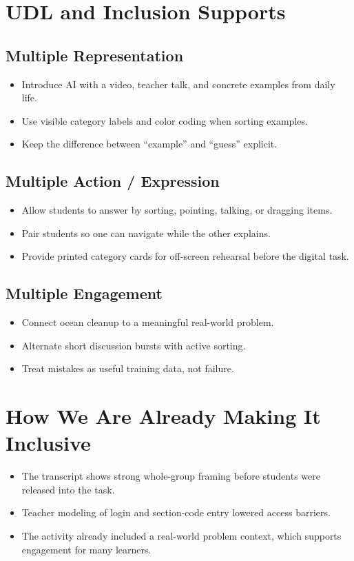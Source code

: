 \documentclass[11pt]{article}
\begin{document}
\section*{UDL and Inclusion Supports}
\subsection*{Multiple Representation}
\begin{itemize}[leftmargin=*]
\item Introduce AI with a video, teacher talk, and concrete examples from daily life.
\item Use visible category labels and color coding when sorting examples.
\item Keep the difference between “example” and “guess” explicit.
\end{itemize}

\subsection*{Multiple Action / Expression}
\begin{itemize}[leftmargin=*]
\item Allow students to answer by sorting, pointing, talking, or dragging items.
\item Pair students so one can navigate while the other explains.
\item Provide printed category cards for off-screen rehearsal before the digital task.
\end{itemize}

\subsection*{Multiple Engagement}
\begin{itemize}[leftmargin=*]
\item Connect ocean cleanup to a meaningful real-world problem.
\item Alternate short discussion bursts with active sorting.
\item Treat mistakes as useful training data, not failure.
\end{itemize}

\section*{How We Are Already Making It Inclusive}
\begin{itemize}[leftmargin=*]
\item The transcript shows strong whole-group framing before students were released into the task.
\item Teacher modeling of login and section-code entry lowered access barriers.
\item The activity already included a real-world problem context, which supports engagement for many learners.
\end{itemize}
\end{document}
